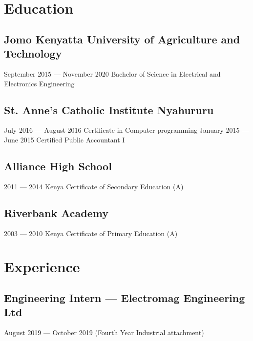 \documentclass[a4paper,10pt]{article}
\begin{document}
\section{Education}
\subsection{Jomo Kenyatta University of Agriculture and Technology}
September 2015 --- November 2020
Bachelor of Science in Electrical and Electronics Engineering
\subsection{St. Anne's Catholic Institute Nyahururu}
July 2016 --- August 2016
Certificate in Computer programming
January 2015 --- June 2015
Certified Public Accountant I
\subsection{Alliance High School}
2011 --- 2014
Kenya Certificate of Secondary Education (A)
\subsection{Riverbank Academy}
2003 --- 2010
Kenya Certificate of Primary Education (A)

\section{Experience}
\subsection{Engineering Intern --- Electromag Engineering Ltd}
August 2019 --- October 2019 (Fourth Year Industrial attachment)
\end{document}

